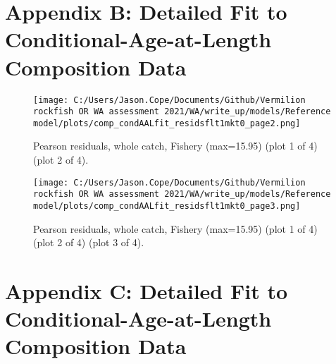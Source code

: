 \documentclass[11pt,
  english,
  a4paper,
]{article}
\begin{document}
\tagmcend\tagstructend

\clearpage


\hypertarget{app-b}{%
\section{Appendix B: Detailed Fit to Conditional-Age-at-Length Composition Data}\label{app-b}}

\leavevmode\tagmcend\tagstructend


\begin{figure}
\centering
\texttt{[image: C:/Users/Jason.Cope/Documents/Github/Vermilion rockfish OR WA assessment 2021/WA/write\_up/models/Reference model/plots/comp\_condAALfit\_residsflt1mkt0\_page2.png]}
\caption{Pearson residuals, whole catch, Fishery (max=15.95) (plot 1 of 4) (plot 2 of 4).\label{fig:comp_condAALfit_residsflt1mkt0_page2}}
\end{figure}

\tagmcend\tagstructend


\begin{figure}
\centering
\texttt{[image: C:/Users/Jason.Cope/Documents/Github/Vermilion rockfish OR WA assessment 2021/WA/write\_up/models/Reference model/plots/comp\_condAALfit\_residsflt1mkt0\_page3.png]}
\caption{Pearson residuals, whole catch, Fishery (max=15.95) (plot 1 of 4) (plot 2 of 4) (plot 3 of 4).\label{fig:comp_condAALfit_residsflt1mkt0_page3}}
\end{figure}

\tagmcend\tagstructend

\clearpage


\hypertarget{app-c}{%
\section{Appendix C: Detailed Fit to Conditional-Age-at-Length Composition Data}\label{app-c}}
\end{document}
